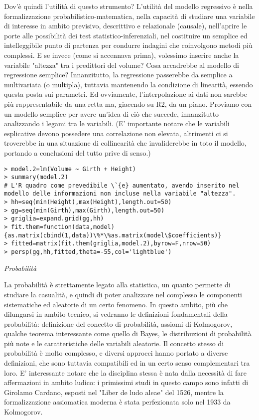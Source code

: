\documentclass{book}
\begin{document}
Dov'\`{e} quindi l'utilit\`{a} di questo strumento? L'utilit\`{a} del modello regressivo \`{e} nella formalizzazione probabilistico-matematica, nella capacit\`{a} di studiare una variabile di interesse in ambito previsivo, descrittivo e relazionale (causale), nell'aprire le porte alle possibilit\`{a} dei test statistico-inferenziali, nel costituire un semplice ed intelleggibile punto di partenza per condurre indagini che coinvolgono metodi più complessi.
E se invece (come si accennava prima), volessimo inserire anche la variabile "altezza" tra i predittori del volume? Cosa accadrebbe al modello di regressione semplice?
Innanzitutto, la regressione passerebbe da semplice a multivariata (o multipla), tuttavia mantenendo la condizione di linearit\`{a}, essendo questa posta sui parametri. Ed ovviamente, l'interpolazione ai dati non sarebbe più rappresentabile da una retta ma, giacendo su R2, da un piano.
Proviamo con un modello semplice per avere un'idea di ciò che succede, innanzitutto analizzando i legami tra le variabili. (E' importante notare che le variabili esplicative devono possedere una correlazione non elevata, altrimenti ci si troverebbe in una situazione di collinearit\`{a} che invaliderebbe in toto il modello, portando a conclusioni del tutto prive di senso.)

\begin{verbatim}
> model.2=lm(Volume ~ Girth + Height)
> summary(model.2)
# L'R quadro come prevedibile \`{e} aumentato, avendo inserito nel modello delle informazioni non incluse nella variabile "altezza".
> hh=seq(min(Height),max(Height),length.out=50)
> gg=seq(min(Girth),max(Girth),length.out=50)
> griglia=expand.grid(gg,hh)
> fit.them=function(data,model) {as.matrix(cbind(1,data))\%*\%as.matrix(model\$coefficients)}
> fitted=matrix(fit.them(griglia,model.2),byrow=F,nrow=50)
> persp(gg,hh,fitted,theta=-55,col='lightblue')
\end{verbatim}

		\emph{Probabilit\`{a}}

La probabilit\`{a} \`{e} strettamente legato alla statistica, un quanto permette di studiare la casualit\`{a}, e quindi di poter analizzare nel complesso le componenti sistematiche ed aleatorie di un certo fenomeno. In questo ambito, più che dilungarsi in ambito tecnico, si vedranno le definizioni fondamentali della probabilit\`{a}: definizione del concetto di probabilit\`{a}, assiomi di Kolmogorov, qualche teorema interessante come quello di Bayes, le distribuzioni di probabilit\`{a} più note e le caratteristiche delle variabili aleatorie.
Il concetto stesso di probabilit\`{a} \`{e} molto complesso, e diversi approcci hanno portato a diverse definizioni, che sono tuttavia compatibili ed in un certo senso complementari tra loro. E' interessante notare che la disciplina stessa \`{e} nata dalla necessit\`{a} di fare affermazioni in ambito ludico: i primissimi studi in questo campo sono infatti di Girolamo Cardano, esposti nel "Liber de ludo aleae" del 1526, mentre la formalizzazione assiomatica moderna \`{e} stata perfezionata solo nel 1933 da Kolmogorov.
\end{document}
